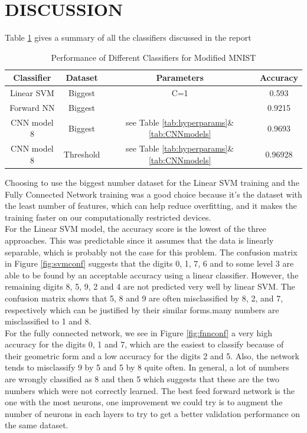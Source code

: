 \documentclass[letterpaper, 10 pt, conference]{ieeeconf}  %
\begin{document}
\section{DISCUSSION}
Table \ref{tab:perfAll} gives a summary of all the classifiers discussed in the report
\begin{table}
	\centering
	\caption{Performance of Different Classifiers for Modified MNIST}
	\label{tab:perfAll}
	\begin{tabular}{cccc}
		\hline
		Classifier & Dataset& Parameters & Accuracy\\\hline
		Linear SVM & Biggest &C=1 & 0.593\\
		Forward NN & Biggest & &0.9215\\
		CNN model 8& Biggest & see Table \ref{tab:hyperparams}\&\ref{tab:CNNmodels} &0.9693\\	
		CNN model 8& Threshold & see Table \ref{tab:hyperparams}\&\ref{tab:CNNmodels} &0.96928\footnotemark\\					
	\end{tabular}
\end{table}

Choosing to use the biggest number dataset for the Linear SVM training and the Fully Connected Network training was a good choice because it's the dataset with the least number of features, which can help reduce overfitting, and it makes the training faster on our computationally restricted devices. \\
For the Linear SVM model, the accuracy score is the lowest of the three approaches. This was predictable since it assumes that the data is linearly separable, which is probably not the case for this problem. The confusion matrix in Figure \ref{fig:svmconf} suggests that the digits 0, 1, 7, 6 and to some level 3 are able to be found by an acceptable accuracy using a linear classifier. However, the remaining digits 8, 5, 9, 2 and 4 are not predicted very well by linear SVM. The confusion matrix shows that 5, 8 and 9 are often misclassified by 8, 2, and 7, respectively which can be justified by their similar forms.many numbers are misclassified to 1 and 8.\\
For the fully connected network, we see in Figure \ref{fig:fnnconf} a very high accuracy for the digits 0, 1 and 7, which are the easiest to classify because of their geometric form and a low accuracy for the digits 2 and 5. Also, the network tends to misclassify 9 by 5 and 5 by 8 quite often. In general, a lot of numbers are wrongly classified as 8 and then 5 which suggests that these are the two numbers which were not correctly learned.
The best feed forward network is the one with the most neurons, one improvement we could try is to augment the number of neurons in each layers to try to get a better validation performance on the same dataset. \\
\end{document}

